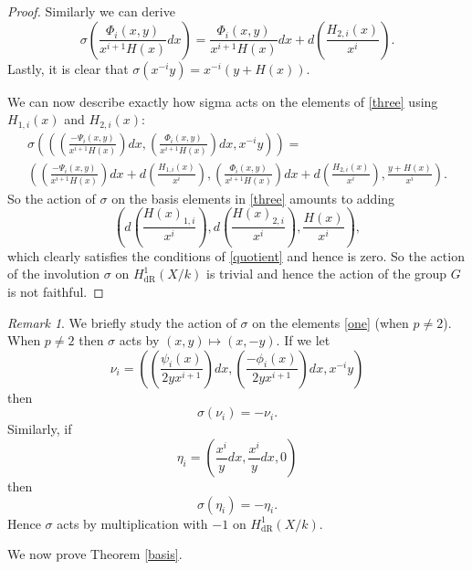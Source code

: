 \documentclass[11pt]{article} %
\theoremstyle{plain}
\theoremstyle{remark}
\newtheorem*{rem}{Remark}
\newcommand{\derhamhone}{H_{\text {dR}}^1(X/k)}
\begin{document}
\begin{proof}
Similarly we can derive
\begin{equation*}
\sigma \left( \frac{\Phi_i(x,y)}{x^{i+1}H(x)} dx \right)  = \frac{\Phi_i(x,y)}{x^{i+1}H(x)} dx + d \left( \frac{H_{2,i}(x)}{x^i} \right).
\end{equation*}
Lastly, it is clear that $\sigma(x^{-i}y) = x^{-i}(y+H(x))$.


We can now describe exactly how sigma acts on the elements of \eqref{three} using $H_{1,i}(x)$ and $H_{2,i}(x)$:
\begin{multline*}
\sigma \left( \left( \left(\frac{-\Psi_i(x,y)}{x^{i+1}H(x)}\right) dx, \left( \frac{\Phi_i(x,y)}{x^{i+1}H(x)} \right) dx, x^{-i}y \right)\right) = \\
 \left( \left(\frac{-\Psi_i(x,y)}{x^{i+1}H(x)} \right) dx + d\left(\frac{H_{1,i}(x)}{x^i}\right),  \left( \frac{\Phi_i(x,y)}{x^{i+1}H(x)} \right) dx+ d\left(\frac{H_{2,i}(x)}{x^i} \right), \frac{y+H(x)}{x^i} \right).
\end{multline*}
So the action of $\sigma$ on the basis elements in \eqref{three} amounts to adding 
\[
\left( d\left(\frac{H(x)_{1,i}}{x^i}\right), d\left(\frac{H(x)_{2,i}}{x^i}\right), \frac{H(x)}{x^i} \right),
\]
which clearly satisfies the conditions of \eqref{quotient} and hence is zero.
So the action of the involution $\sigma$ on $\derhamhone$ is trivial and hence the action of the group $G$ is not faithful.
\end{proof}

\begin{rem}
We briefly study the action of $\sigma$ on the elements \eqref{one} (when $p\neq 2$).
When $p \neq 2$ then $\sigma$ acts by $(x,y) \mapsto (x,-y)$.
If we let
\[
\nu_i = \left( \left( \frac{\psi_i(x)}{2yx^{i+1}}\right) dx, \left(\frac{-\phi_i(x)}{2yx^{i+1}}\right) dx, x^{-i}y\right)
\]
then 
\begin{equation*}
\sigma(\nu_i) = -\nu_i.
\end{equation*}
Similarly, if 
\[
\eta_i = \left( \frac{x^i}{y}dx, \frac{x^i}{y}dx, 0 \right)
\]
then 
\[
\sigma(\eta_i) = - \eta_i.
\]
Hence $\sigma$ acts by multiplication with $-1$ on $\derhamhone$.
\end{rem}


We now prove Theorem \ref{basis}.
\end{document}
